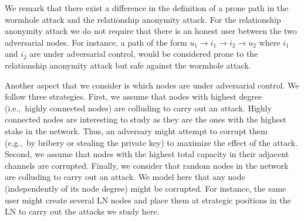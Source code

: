 
We remark that there exist a difference in the definition of a prone path in the wormhole attack and the relationship anonymity attack. 
For the relationship anonymity attack we do not require that there is an honest user between the two adversarial nodes.
For instance, a path of the form $u_1 \rightarrow i_1 \rightarrow i_2 \rightarrow u_2$ where $i_1$ and $i_2$ are under adversarial control,  would be considered prone to the relationship anonymity attack but safe against the wormhole attack. 

Another aspect that we consider is which nodes are under adversarial control.
We follow three strategies. 
First, we assume that nodes with highest degree (i.e.,~highly connected nodes) are colluding to carry out an attack. 
Highly connected nodes are interesting to study as they are the ones with the highest stake in the network. 
Thus, an adversary might attempt to corrupt them (e.g.,~by bribery or stealing the private key) to maximize the effect of the attack. 
Second, we assume that nodes with the highest total capacity in their adjacent channels are corrupted.
Finally, we consider that random nodes in the network are colluding to carry out an attack. 
We model here that any node (independently of its node degree) might be corrupted.
For instance, the same user might create several LN nodes and place them at strategic positions in the LN to carry out the attacks we study here. 

